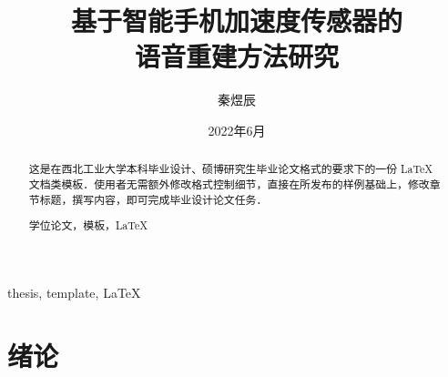 \documentclass[lang=chs, degree=phd, blindreview=false, adobe=true]{yanputhesis}
\title{基于智能手机加速度传感器的 \\ 语音重建方法研究}{          %
    基于智能手机加速度传感器的语音重建方法研究
}                                                           %
\author{秦煜辰}{Yuchen Qin}                              %
\date{2022年6月}{Jun 2022}                                  %
\begin{document}
\frontmatter                                                %
\maketitle                                                  %
\begin{abstract}                                            %
    这是在西北工业大学本科毕业设计、硕博研究生毕业论文格式的要求下的一份 LaTeX
    文档类模板．使用者无需额外修改格式控制细节，直接在所发布的样例基础上，修改章
    节标题，撰写内容，即可完成毕业设计论文任务．            %
    \begin{keywords}                                        %
        学位论文，模板，\LaTeX                              %
    \end{keywords}                                          %
\end{abstract}                                              %
\begin{engabstract}                                         %
    \noindent \blindtext                                    %
    \begin{engkeywords}                                     %
        thesis, template, \LaTeX                            %
    \end{engkeywords}                                       %
\end{engabstract}                                           %
\tableofcontents                                            %
\listoffigures                                              %
\listoftables                                               %
\printnomenclature                                          %
\mainmatter
\sDefault
\chapter{绪论}
\end{document}
